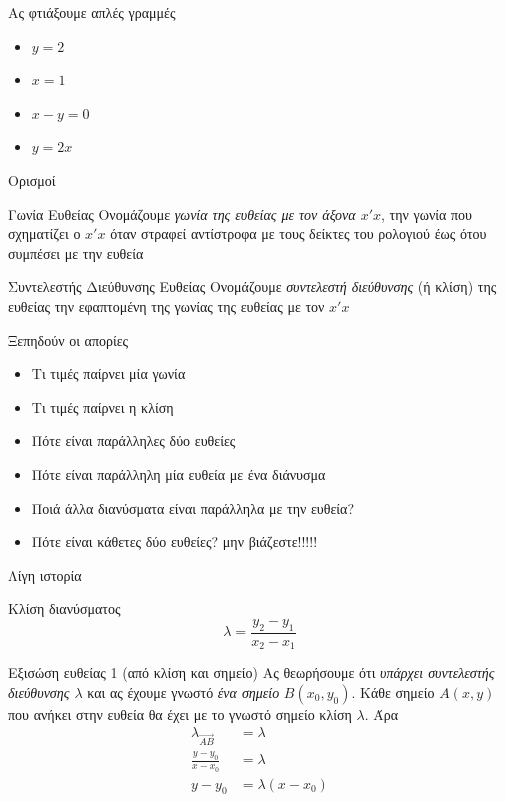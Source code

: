 \documentclass{presentation}
\begin{document}
\begin{frame}{Ας φτιάξουμε απλές γραμμές}
  \begin{itemize}[<+->]
    \item $y=2$
    \item $x=1$
    \item $x-y=0$
    \item $y=2x$
  \end{itemize}
\end{frame}

\begin{frame}{Ορισμοί}
  \begin{block}{Γωνία Ευθείας}
    Ονομάζουμε \emph{γωνία της ευθείας με τον άξονα $x'x$}, την γωνία που σχηματίζει ο $x'x$ όταν στραφεί αντίστροφα με τους δείκτες του ρολογιού έως ότου συμπέσει με την ευθεία
  \end{block}
  \begin{block}{Συντελεστής Διεύθυνσης Ευθείας}
    Ονομάζουμε \emph{συντελεστή διεύθυνσης} (ή κλίση) της ευθείας την εφαπτομένη της γωνίας της ευθείας με τον $x'x$
  \end{block}
\end{frame}

\begin{frame}{Ξεπηδούν οι απορίες}
  \begin{itemize}[<+->]
    \item Τι τιμές παίρνει μία γωνία
    \item Τι τιμές παίρνει η κλίση
    \item Πότε είναι παράλληλες δύο ευθείες
    \item Πότε είναι παράλληλη μία ευθεία με ένα διάνυσμα
    \item Ποιά άλλα διανύσματα είναι παράλληλα με την ευθεία?
    \item Πότε είναι κάθετες δύο ευθείες? μην βιάζεστε!!!!!
  \end{itemize}
\end{frame}

\begin{frame}{Λίγη ιστορία}
  \begin{block}{Κλίση διανύσματος}
    $$λ=\frac{y_2-y_1}{x_2-x_1}$$
  \end{block}
\end{frame}

\begin{frame}{Εξισώση ευθείας 1 (από κλίση και σημείο)}
  Ας θεωρήσουμε ότι \emph{υπάρχει συντελεστής διεύθυνσης $λ$} και ας έχουμε γνωστό \emph{ένα σημείο} $B(x_0,y_0)$. Κάθε σημείο $A(x,y)$ που ανήκει στην ευθεία θα έχει με το γνωστό σημείο κλίση $λ$. Άρα
  \begin{align*}
    λ_{\overrightarrow{AB}} & =λ        \\
    \frac{y-y_0}{x-x_0}     & =λ        \\
    y-y_0                   & =λ(x-x_0)
  \end{align*}
\end{frame}
\end{document}
